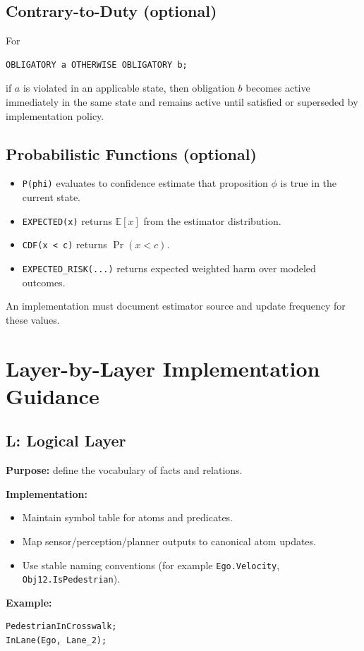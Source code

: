 \documentclass[11pt,a4paper]{article}
\begin{document}
\subsection{Contrary-to-Duty (optional)}
For
\begin{lstlisting}
OBLIGATORY a OTHERWISE OBLIGATORY b;
\end{lstlisting}
if $a$ is violated in an applicable state, then obligation $b$ becomes active immediately in the same state and remains active until satisfied or superseded by implementation policy.

\subsection{Probabilistic Functions (optional)}
\begin{itemize}[leftmargin=*]
  \item \texttt{P(phi)} evaluates to confidence estimate that proposition $\phi$ is true in the current state.
  \item \texttt{EXPECTED(x)} returns $\mathbb{E}[x]$ from the estimator distribution.
  \item \texttt{CDF(x < c)} returns $\Pr(x < c)$.
  \item \texttt{EXPECTED\_RISK(...)} returns expected weighted harm over modeled outcomes.
\end{itemize}
An implementation must document estimator source and update frequency for these values.

\section{Layer-by-Layer Implementation Guidance}
\subsection{L: Logical Layer}
\textbf{Purpose:} define the vocabulary of facts and relations.

\textbf{Implementation:}
\begin{itemize}[leftmargin=*]
  \item Maintain symbol table for atoms and predicates.
  \item Map sensor/perception/planner outputs to canonical atom updates.
  \item Use stable naming conventions (for example \texttt{Ego.Velocity}, \texttt{Obj12.IsPedestrian}).
\end{itemize}

\textbf{Example:}
\begin{lstlisting}
PedestrianInCrosswalk;
InLane(Ego, Lane_2);
\end{lstlisting}
\end{document}

